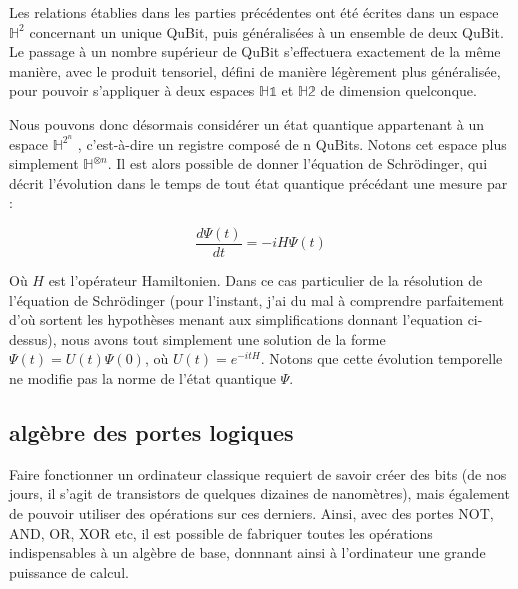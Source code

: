 \documentclass[a4paper,12pt]{report}
\begin{document}
\par{
	Les relations établies dans les parties précédentes ont été écrites dans un espace $\mathbb{H}^2$ concernant un unique QuBit, puis généralisées à un ensemble de deux QuBit. Le passage à un nombre supérieur de QuBit s'effectuera exactement de la même manière, avec le produit tensoriel, défini de manière légèrement plus généralisée, pour pouvoir s'appliquer à deux espaces $\mathbb{H1}$ et $\mathbb{H2}$ de dimension quelconque.
}

\vspace{1\baselineskip}

\par{
	Nous pouvons donc désormais considérer un état quantique appartenant à un espace $\mathbb{H}^{2^n}$ , c'est-à-dire un registre composé de n QuBits. Notons cet espace plus simplement $\mathbb{H}^{\otimes n}$. Il est alors possible de donner l'équation de Schrödinger, qui décrit l'évolution dans le temps de tout état quantique précédant une mesure par :
}

\begin{equation}
	\frac{d \Psi(t)}{dt} = -i H \Psi(t)
\end{equation}

\vspace{1\baselineskip}

\par{
	Où $H$ est l'opérateur Hamiltonien. Dans ce cas particulier de la résolution de l'équation de Schrödinger (pour l'instant, j'ai du mal à comprendre parfaitement d'où sortent les hypothèses menant aux simplifications donnant l'equation ci-dessus), nous avons tout simplement une solution de la forme $\Psi(t) = U(t) \Psi(0)$, où $U(t) = e^{-itH}$. Notons que cette évolution temporelle ne modifie pas la norme de l'état quantique $\Psi$.
}

		\subsection{algèbre des portes logiques}

\par{
	Faire fonctionner un ordinateur classique requiert de savoir créer des bits (de nos jours, il s'agit de transistors de quelques dizaines de nanomètres), mais également de pouvoir utiliser des opérations sur ces derniers. Ainsi, avec des portes NOT, AND, OR, XOR etc, il est possible de fabriquer toutes les opérations indispensables à un algèbre de base, donnnant ainsi à l'ordinateur une grande puissance de calcul.
}
\end{document}
